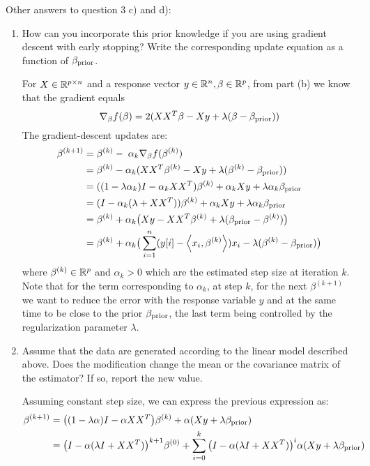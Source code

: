 \documentclass[12pt,twoside]{article}
\begin{document}
 Other answers to question 3 c) and d):
 \begin{enumerate}
 
     \item How can you incorporate this prior knowledge if you are using gradient descent with early stopping? Write the corresponding update equation as a function of $\beta_{\operatorname{prior}}$.\\

\medskip				

For $X  \in \mathbb{R}^{p \times n}$ and a response vector $y \in \mathbb{R}^n, \beta \in \mathbb{R}^p$, from part (b) we know that the gradient equals $$\nabla_{\beta} f(\beta) =	2 (X X^T \beta - X y +  \lambda (\beta - \beta_{\operatorname{prior}}))$$
The gradient-descent updates are:
\begin{align*}
		\beta^{(k+1)}	&=	\beta^{(k)} - \; \alpha_k \nabla_{\beta} f(\beta^{(k)})	\\
					&=	\beta^{(k)}  - \alpha_k (X X^T \beta^{(k)} - X y +  \lambda (\beta^{(k)} - \beta_{\operatorname{prior}})) \\
					&=    ((1- \lambda \alpha_k) I  - \alpha_k X X^T) \beta^{(k)}  +  \alpha_k  X y  + \lambda  \alpha_k  \beta_{\operatorname{prior}} \\
					&=	(I -  \alpha_k (\lambda +  X X^T)) \beta^{(k)}  +  \alpha_k  X y  + \lambda  \alpha_k  \beta_{\operatorname{prior}} \\
					&=	\beta^{(k)}  + \alpha_k  \big( X y  - X X^T \beta^{(k)}   + \lambda (\beta_{\operatorname{prior}} - \beta^{(k)}) \big) \\
					&=	 \beta^{(k)}  +  \alpha_k  \big( \sum_{i=1}^n (y[i] - \left \langle x_i, \beta^{(k)}\right \rangle) x_i - \lambda ( \beta^{(k)}  -   \beta_{\operatorname{prior}}) \big)
\end{align*}
   where $\beta^{(k)} \in \mathbb{R}^p$ and $ \alpha_k > 0$ which are the estimated step size at iteration $k$. Note that for the term corresponding to $\alpha_k$, at  step $k$, for the next $\beta^{(k+1)}$ 
   we want to reduce the error with the response variable $y$  and at the same time to be close to the prior $\beta_{\operatorname{prior}}$, the last term being controlled by the regularization parameter $\lambda$.
   
    \item Assume that the data are generated according to the linear model described above. Does the modification change the mean or the covariance matrix of the estimator? If so, report the new value.\\
    
\medskip

Assuming constant step size, we can express the previous expression as:
\begin{align*}
		\beta^{(k+1)}	&=	\big( (1 - \lambda \alpha)  I - \alpha X X^T \big) \beta^{(k)}		+  	\alpha (X y + \lambda \beta_{\operatorname{prior}}) \\
					&=	\big(I - \alpha (\lambda I + X X^T)  \big)^{k+1} \beta^{(0)}		+	\sum_{i=0}^k \big(I - \alpha (\lambda I + X X^T)  \big)^i \alpha (X y + \lambda \beta_{\operatorname{prior}})
\end{align*}


\end{enumerate}
\end{document}
